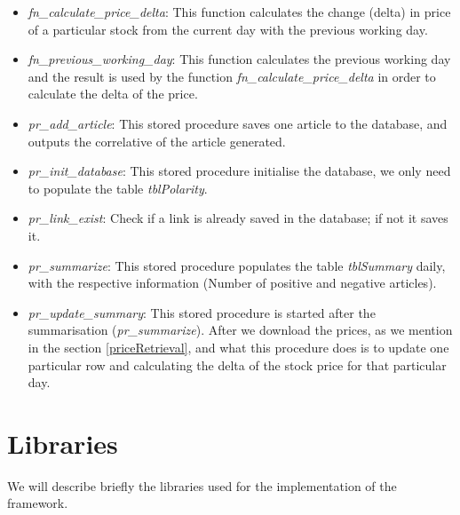 \begin{itemize}
	\item \emph{fn\_calculate\_price\_delta}: This function calculates the change (delta) in price of a particular stock from the current day with the previous working day.
	\item \emph{fn\_previous\_working\_day}: This function calculates the previous working day and the result is used by the function \emph{fn\_calculate\_price\_delta} in order to calculate the delta of the price.
	\item \emph{pr\_add\_article}: This stored procedure saves one article to the database, and outputs the correlative of the article generated.
	\item \emph{pr\_init\_database}: This stored procedure initialise the database, we only need to populate the table \emph{tblPolarity}.
	\item \emph{pr\_link\_exist}: Check if a link is already saved in the database; if not it saves it.
	\item \emph{pr\_summarize}: This stored procedure populates the table \emph{tblSummary} daily, with the respective information (Number of positive and negative articles).
	\item \emph{pr\_update\_summary}: This stored procedure is started after the summarisation (\emph{pr\_summarize}). After we download the prices, as we mention in the section \ref{priceRetrieval}, and what this procedure does is to update one particular row and calculating the delta of the stock price for that particular day.
\end{itemize}

\section{Libraries}
We will describe briefly the libraries used for the implementation of the framework. 

